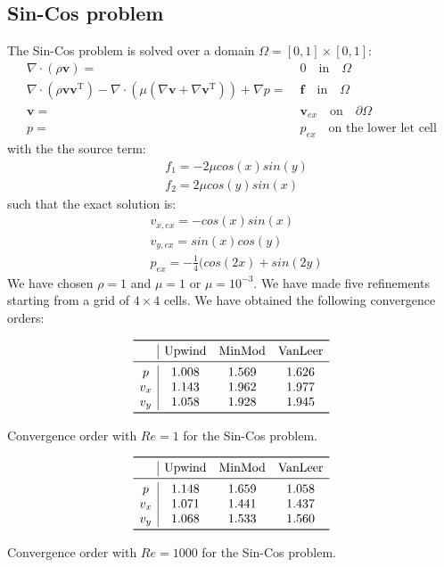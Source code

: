 \documentclass[11pt, a4paper]{article}
\theoremstyle{definition}
\begin{document}
\subsection{Sin-Cos problem}
The Sin-Cos problem is solved over a domain $\Omega = [0,1] \times [0,1]$:
\begin{align*}
\nabla \cdot (\rho \mathbf{v}) =& \; 0 \quad \text{in} \quad \Omega\\
\nabla \cdot (\rho \mathbf{v} \mathbf{v^\mathrm{T}}) - \nabla \cdot (\mu 
(\nabla 
\mathbf{v} + \nabla \mathbf{v}^\mathrm{T})) + 
\nabla p =& \; \mathbf{f} \quad \text{in} \quad \Omega\\
\mathbf{v} =& \; \mathbf{v}_{ex} \quad \text{on} \quad \partial \Omega\\
p =& \; p_{ex} \quad \text{on the lower let cell}
\end{align*}
with the the source term:
\begin{align*}
&f_1 = -2 \mu cos(x) sin(y)\\
&f_2 =  2 \mu cos(y) sin(x)
\end{align*}
such that the exact solution is:
\begin{align*}
&v_{x,ex} = -cos(x) sin(x)\\
&v_{y,ex} = sin(x) cos(y)\\
&p_{ex} = -\frac{1}{4} (cos(2x)+sin(2y)
\end{align*}
We have chosen $\rho = 1$ and $\mu = 1$ or $ \mu = 10^{-3}$.
We have made five refinements starting from a grid of $4 \times 4$ cells.
We have obtained the following convergence orders:
\begin{table}[h]
	\centering
	\[
	\begin{array}{c|ccc}
	\toprule
	& \text{Upwind} & \text{MinMod} & \text{VanLeer} \\ 
	\midrule
	p & 1.008 & 1.569 & 1.626\\
	v_x & 1.143 & 1.962 & 1.977\\
	v_y & 1.058 & 1.928 & 1.945\\
	\bottomrule
	\end{array}
	\]
	\caption{Convergence order with $Re = 1$ for the Sin-Cos problem.}
	\label{tab:sin_lre}
	
	\[
	\begin{array}{c|ccc}
	\toprule
	& \text{Upwind} & \text{MinMod} & \text{VanLeer} \\ 
	\midrule
	p & 1.148 & 1.659 & 1.058\\
	v_x & 1.071 & 1.441 & 1.437\\
	v_y & 1.068 & 1.533 & 1.560\\
	\bottomrule
	\end{array}
	\]
	\caption{Convergence order with $Re = 1000$ for the Sin-Cos problem.}
	\label{tab:sin_hre}
\end{table}
\end{document}
